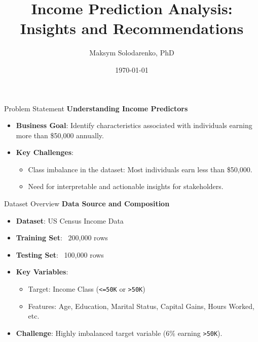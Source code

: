 \documentclass{beamer}
\title{Income Prediction Analysis:\\ Insights and Recommendations}
\author{Maksym Solodarenko, PhD}
\date{\today}
\begin{document}
\begin{frame}
	\titlepage
\end{frame}

\begin{frame}{Problem Statement}
	\textbf{Understanding Income Predictors}
	\begin{itemize}
		\item \textbf{Business Goal}: Identify characteristics associated with individuals earning more than \$50,000 annually.
		\item \textbf{Key Challenges}:
			\begin{itemize}
				\item Class imbalance in the dataset: Most individuals earn less than \$50,000.
				\item Need for interpretable and actionable insights for stakeholders.
			\end{itemize}
	\end{itemize}
\end{frame}

\begin{frame}{Dataset Overview}
	\textbf{Data Source and Composition}
	\begin{itemize}
		\item \textbf{Dataset}: US Census Income Data
		\item \textbf{Training Set}: ~200,000 rows
		\item \textbf{Testing Set}: ~100,000 rows
		\item \textbf{Key Variables}:
			\begin{itemize}
				\item Target: Income Class (\texttt{<=50K} or \texttt{>50K})
				\item Features: Age, Education, Marital Status, Capital Gains, Hours Worked, etc.
			\end{itemize}
		\item \textbf{Challenge}: Highly imbalanced target variable (6\% earning \texttt{>50K}).
	\end{itemize}
\end{frame}
\end{document}
